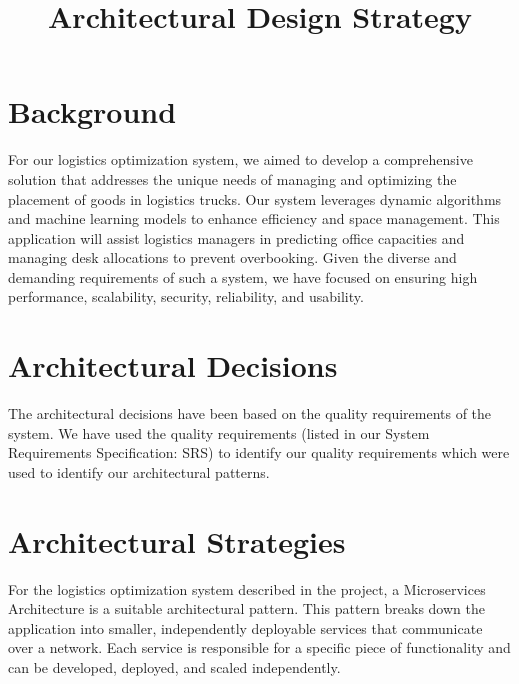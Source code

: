 \documentclass{article}
\title{Architectural Design Strategy}
\author{}
\date{}
\begin{document}
\maketitle

\section{Background}
For our logistics optimization system, we aimed to develop a comprehensive solution
that addresses the unique needs of managing and optimizing the placement of goods in
logistics trucks. Our system leverages dynamic algorithms and machine learning
models to enhance efficiency and space management. This application will assist
logistics managers in predicting office capacities and managing desk allocations to
prevent overbooking. Given the diverse and demanding requirements of such a system,
we have focused on ensuring high performance, scalability, security, reliability, and
usability.

\section{Architectural Decisions}
The architectural decisions have been based on the quality requirements of the system.
We have used the quality requirements (listed in our System Requirements
Specification: SRS) to identify our quality requirements which were used to identify our
architectural patterns.

\section{Architectural Strategies}
For the logistics optimization system described in the project, a Microservices
Architecture is a suitable architectural pattern. This pattern breaks down the application
into smaller, independently deployable services that communicate over a network. Each
service is responsible for a specific piece of functionality and can be developed,
deployed, and scaled independently.
\end{document}
